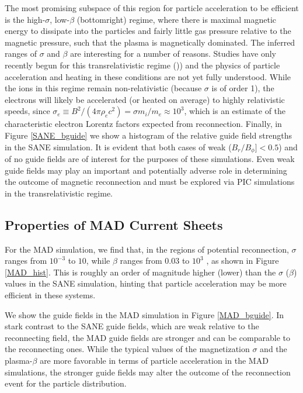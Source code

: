 The most promising subspace of this region for particle
acceleration to be efficient is the high-$\sigma$, low-$\beta$ (bottomright) regime, where there is maximal magnetic energy to
dissipate into the particles and fairly little gas pressure
relative to the magnetic pressure, such that the plasma is
magnetically dominated. The inferred ranges of $\sigma$ and $\beta$
are interesting for a number of reasons. Studies have only
recently begun for this transrelativistic regime (\citealt{werner2016})) and the physics of particle acceleration and
heating in these conditions are not yet fully understood.
While the ions in this regime remain non-relativistic (because $\sigma$ is of order 1), the electrons will likely be accelerated (or heated on average) to highly relativistic speeds,
since $\sigma_e \equiv B^2/(4\pi \rho_e c^2)=\sigma m_i/m_e \approx 10^3$, which is an
estimate of the characteristic electron Lorentz factors expected from reconnection.
Finally, in Figure \ref{SANE_bguide} we show a histogram of the relative guide field strengths in the SANE simulation. It is
evident that both cases of weak ($B_r/B_{\phi}] < 0.5$) and of no
guide fields are of interest for the purposes of these simulations. Even weak guide fields may play an important
and potentially adverse role in determining the outcome
of magnetic reconnection and must be explored via PIC simulations in the transrelativistic regime.

\subsection{Properties of MAD Current Sheets}

For the MAD simulation, we find that, in the regions of potential reconnection, $\sigma$ ranges from $10^{-3}$ to $10$, while $\beta$ ranges from $0.03$ to $10^{3}$ , as shown in Figure \ref{MAD_hist}. This is roughly an order of magnitude higher (lower) than the $\sigma$ ($\beta$) values in the SANE simulation, hinting that particle acceleration may be more efficient in these systems.

We show the guide fields in the MAD simulation in Figure \ref{MAD_bguide}. In stark contrast to the SANE guide fields, which are weak relative to the reconnecting field, the MAD guide fields are stronger and can be comparable to the reconnecting ones. While the typical values of the magnetization $\sigma$ and the plasma-$\beta$ are more favorable in terms of particle acceleration in the MAD simulations,
the stronger guide fields may alter the outcome of the reconnection event for the particle distribution.

